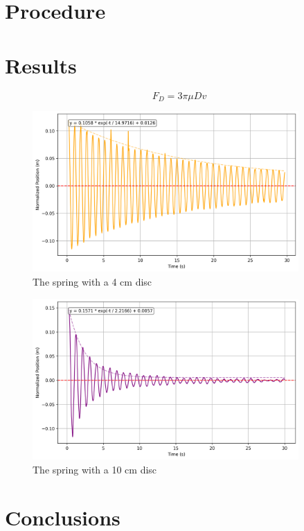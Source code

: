 \documentclass[12pt,letterpaper]{article}
\begin{document}
\pagebreak
\section{Procedure}

\lipsum[1]

\section{Results}

\lipsum[1]

\begin{equation}
    F_D=3\pi \mu Dv
\end{equation}

 \begin{figure}[h]
     \centering
     \includegraphics[width=4in]{images/4cm.png}
     \caption{The spring with a 4 cm disc}
     \label{fig:4cm}
 \end{figure}

  \begin{figure}[h]
     \centering
     \includegraphics[width=4in]{images/10cm.png}
     \caption{The spring with a 10 cm disc}
     \label{fig:10cm}
 \end{figure}

\section{Conclusions}

\lipsum[1]


% 
% 
\end{document}
